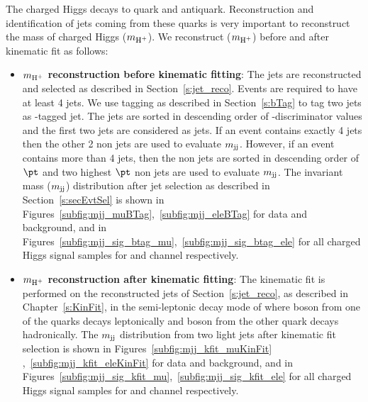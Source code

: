 The charged Higgs decays to \PQc quark and \PQs antiquark. Reconstruction and
identification of jets coming from these quarks is very important to reconstruct 
the mass of charged Higgs ($m_{\text{H}^+}$). We reconstruct ($m_{\text{H}^+}$) before and after 
kinematic fit as follows:
\begin{itemize}[leftmargin=*]
    \item {\bf{$m_{\text{H}^+}$ reconstruction before kinematic fitting}}: The jets are 
        reconstructed and selected as described in Section~\ref{s:jet_reco}. Events are
        required to have at least 4 jets. We use \PQb tagging as described in Section~\ref{s:bTag}
        to tag two jets as \PQb-tagged jet. The jets are sorted in descending order of 
	\PQb-discriminator values and the first two jets are considered as \PQb jets. If an event 
	contains exactly 4 jets then the other 2 non \PQb jets are used to evaluate $m_\text{jj}$. However, 
	if an event contains more than 4 jets, then the non \PQb jets are sorted in descending order 
	of $\pt$ and two highest $\pt$ non \PQb jets are used to evaluate $m_\text{jj}$. The invariant 
        mass ($m_\text{jj}$) distribution after \PQb jet selection as described in Section~\ref{s:secEvtSel} 
	is shown in Figures~\ref{subfig:mjj_muBTag},~\ref{subfig:mjj_eleBTag} for data and
        background, and in Figures~\ref{subfig:mjj_sig_btag_mu},~\ref{subfig:mjj_sig_btag_ele} for 
	all charged Higgs signal samples for \mujets and \ejets channel respectively.
    
    \item {\bf{$m_{\text{H}^+}$ reconstruction after kinematic fitting}}: The kinematic 
        fit is performed on the reconstructed jets of Section~\ref{s:jet_reco}, as
        described in Chapter~\ref{s:KinFit}, in the semi-leptonic decay mode of
        \ttbar where \PW boson from one of the \PQt quarks decays leptonically 
        and \PW boson from the other \PQt quark decays hadronically. 
	The $m_\text{jj}$ distribution from two light jets after kinematic fit selection is 
	shown in Figures~\ref{subfig:mjj_kfit_muKinFit} ,~\ref{subfig:mjj_kfit_eleKinFit} for data 
	and background, and in Figures~\ref{subfig:mjj_sig_kfit_mu},~\ref{subfig:mjj_sig_kfit_ele} for 
	all charged Higgs signal samples for \mujets and \ejets channel respectively. 
    \end{itemize}
